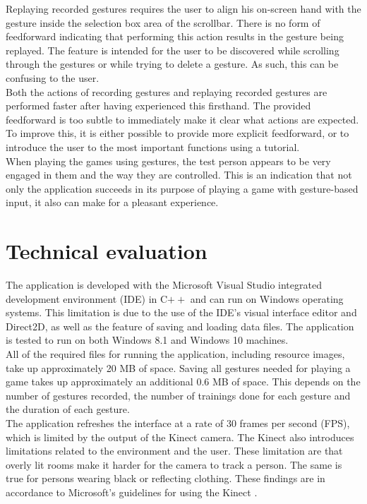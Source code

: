 Replaying recorded gestures requires the user to align his on-screen hand with the gesture inside the selection box area of the scrollbar. There is no form of feedforward indicating that performing this action results in the gesture being replayed. The feature is intended for the user to be discovered while scrolling through the gestures or while trying to delete a gesture. As such, this can be confusing to the user.\\

Both the actions of recording gestures and replaying recorded gestures are performed faster after having experienced this firsthand. The provided feedforward is too subtle to immediately make it clear what actions are expected. To improve this, it is either possible to provide more explicit feedforward, or to introduce the user to the most important functions using a tutorial.\\

When playing the games using gestures, the test person appears to be very engaged in them and the way they are controlled. This is an indication that not only the application succeeds in its purpose of playing a game with gesture-based input, it also can make for a pleasant experience.


\section{Technical evaluation}

The application is developed with the Microsoft Visual Studio integrated development environment (IDE) in C$++$ and can run on Windows operating systems. This limitation is due to the use of the IDE's visual interface editor and Direct2D, as well as the feature of saving and loading data files. The application is tested to run on both Windows 8.1 and Windows 10 machines.\\

All of the required files for running the application, including resource images, take up approximately 20 MB of space. Saving all gestures needed for playing a game takes up approximately an additional 0.6 MB of space. This depends on the number of gestures recorded, the number of trainings done for each gesture and the duration of each gesture.\\

The application refreshes the interface at a rate of 30 frames per second (FPS), which is limited by the output of the Kinect camera. The Kinect also introduces limitations related to the environment and the user. These limitation are that overly lit rooms make it harder for the camera to track a person. The same is true for persons wearing black or reflecting clothing. These findings are in accordance to Microsoft's guidelines for using the Kinect \cite{MicrosoftGuidelines}.